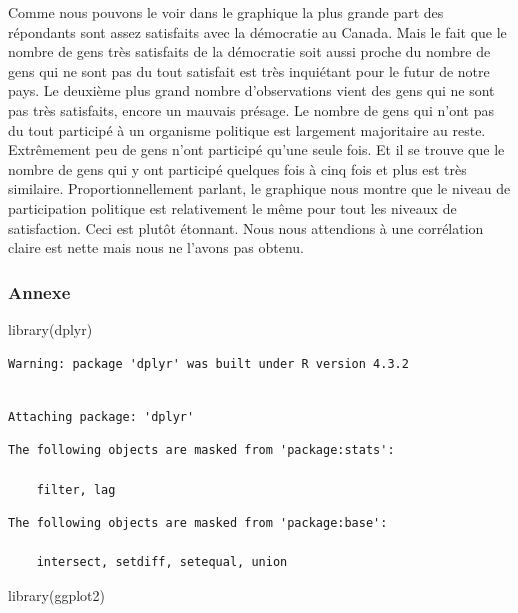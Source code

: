 \documentclass[
  letterpaper,
  DIV=11,
  numbers=noendperiod]{scrartcl}
\newenvironment{Shaded}{\begin{snugshade}}{\end{snugshade}}
\newcommand{\FunctionTok}[1]{\textcolor[rgb]{0.28,0.35,0.67}{#1}}
\newcommand{\NormalTok}[1]{\textcolor[rgb]{0.00,0.23,0.31}{#1}}
\begin{document}
Comme nous pouvons le voir dans le graphique la plus grande part des
répondants sont assez satisfaits avec la démocratie au Canada. Mais le
fait que le nombre de gens très satisfaits de la démocratie soit aussi
proche du nombre de gens qui ne sont pas du tout satisfait est très
inquiétant pour le futur de notre pays. Le deuxième plus grand nombre
d'observations vient des gens qui ne sont pas très satisfaits, encore un
mauvais présage. Le nombre de gens qui n'ont pas du tout participé à un
organisme politique est largement majoritaire au reste. Extrêmement peu
de gens n'ont participé qu'une seule fois. Et il se trouve que le nombre
de gens qui y ont participé quelques fois à cinq fois et plus est très
similaire. Proportionnellement parlant, le graphique nous montre que le
niveau de participation politique est relativement le même pour tout les
niveaux de satisfaction. Ceci est plutôt étonnant. Nous nous attendions
à une corrélation claire est nette mais nous ne l'avons pas obtenu.

\hypertarget{annexe}{%
\subsubsection{Annexe}\label{annexe}}

\begin{Shaded}
\begin{Highlighting}[]
\FunctionTok{library}\NormalTok{(dplyr)}
\end{Highlighting}
\end{Shaded}

\begin{verbatim}
Warning: package 'dplyr' was built under R version 4.3.2
\end{verbatim}

\begin{verbatim}

Attaching package: 'dplyr'
\end{verbatim}

\begin{verbatim}
The following objects are masked from 'package:stats':

    filter, lag
\end{verbatim}

\begin{verbatim}
The following objects are masked from 'package:base':

    intersect, setdiff, setequal, union
\end{verbatim}

\begin{Shaded}
\begin{Highlighting}[]
\FunctionTok{library}\NormalTok{(ggplot2)}
\end{Highlighting}
\end{Shaded}
\end{document}
